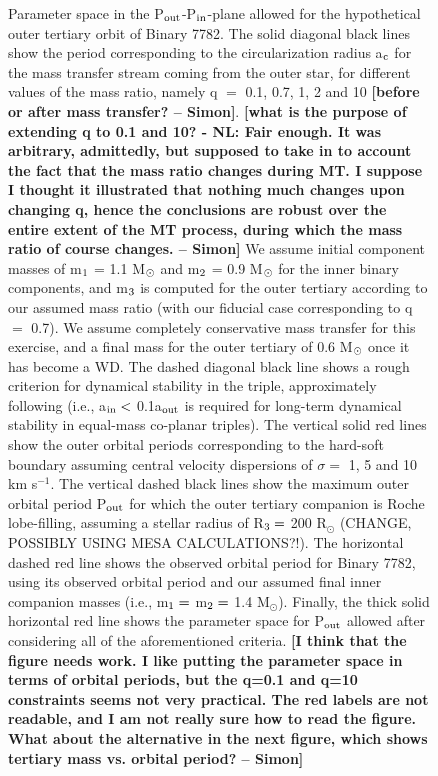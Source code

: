 \documentclass{aastex62}
\def\simon#1{{\bf {\color{red}[#1 -- Simon]}}}
\begin{document}
\begin{figure}[ht!]
\caption{Parameter space in the P$_{\rm out}$-P$_{\rm in}$-plane
  allowed for the hypothetical outer tertiary orbit of Binary 7782.
  The solid diagonal black lines show the period corresponding to the
  circularization radius a$_{\rm c}$ for the mass transfer stream
  coming from the outer star, for different values of the mass ratio,
  namely q $=$ 0.1, 0.7, 1, 2 and 10 \simon{before or after mass
    transfer?}.  \simon{what is the purpose of extending q to 0.1 and
    10? - NL: Fair enough.  It was arbitrary, admittedly, but supposed to take in to account the fact that the mass ratio changes during MT.  I suppose I thought it illustrated that nothing much changes upon changing q, hence the conclusions are robust over the entire extent of the MT process, during which the mass ratio of course changes.} We assume initial component masses of m$_{\rm 1}$ = 1.1
  M$_{\rm \odot}$ and m$_{\rm 2}$ = 0.9 M$_{\rm \odot}$ for the inner
  binary components, and m$_{\rm 3}$ is computed for the outer
  tertiary according to our assumed mass ratio (with our fiducial case
  corresponding to q $=$ 0.7).  We assume completely conservative mass
  transfer for this exercise, and a final mass for the outer tertiary
  of 0.6 M$_{\rm \odot}$ once it has become a WD.  The dashed diagonal
  black line shows a rough criterion for dynamical stability in the
  triple, approximately following \citet{mardling99} (i.e., a$_{\rm
    in} <$ 0.1a$_{\rm out}$ is required for long-term dynamical
  stability in equal-mass co-planar triples).  The vertical solid red
  lines show the outer orbital periods corresponding to the hard-soft
  boundary assuming central velocity dispersions of $\sigma =$ 1, 5
  and 10 km s$^{-1}$.  The vertical dashed black lines show the
  maximum outer orbital period P$_{\rm out}$ for which the outer
  tertiary companion is Roche lobe-filling, assuming a stellar radius
  of R$_{\rm 3} =$ 200 R$_{\odot}$ (CHANGE, POSSIBLY USING MESA
  CALCULATIONS?!).  The horizontal dashed red line shows the observed
  orbital period for Binary 7782, using its observed orbital period
  and our assumed final inner companion masses (i.e., m$_{\rm 1} =$
  m$_{\rm 2} =$ 1.4 M$_{\odot}$).  Finally, the thick solid horizontal
  red line shows the parameter space for P$_{\rm out}$ allowed after
  considering all of the aforementioned criteria.  \simon{I think that
    the figure needs work. I like putting the parameter space in terms
    of orbital periods, but the q=0.1 and q=10 constraints seems
    not very practical. The red labels are not readable, and I am not
    really sure how to read the figure. What about the alternative in
    the next figure, which shows tertiary mass vs. orbital period?}
\label{fig:fig2}}
\end{figure}
\end{document}
